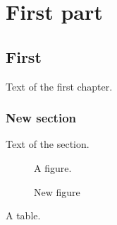 \documentclass{report}
\begin{document}
\dominitoc
\dominilof
\dominilot
\doparttoc
\dopartlof
\dopartlot
\tableofcontents
\listoffigures
\listoftables
\part{First part}
\parttoc
\partlof
\partlot
\chapter{First}
\minitoc
\minilof
\minilot
Text of the first chapter.
\section{New section}
Text of the section.
\begin{figure}[h]
\centering A figure.
\caption{New figure}
\end{figure}
\begin{table}[h]
\centering A table.
\caption{New table}
\end{table}
\end{document}
